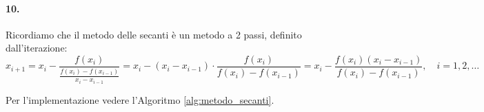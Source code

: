 \paragraph{10.} Ricordiamo che il metodo delle secanti è un metodo a 2 passi, definito dall'iterazione:
\begin{equation*}
	x_{i+1}=x_i-\frac{f(x_i)}{\frac{f(x_i)-f(x_{i-1})}{x_i-x_{i-1}}}=x_i-(x_i-x_{i-1})\cdot\frac{f(x_i)}{f(x_i)-f(x_{i-1})}=x_i-\frac{f(x_i)(x_i-x_{i-1})}{f(x_i)-f(x_{i-1})},\quad i=1,2,\hdots
\end{equation*}

Per l'implementazione vedere l'Algoritmo \ref{alg:metodo_secanti}.